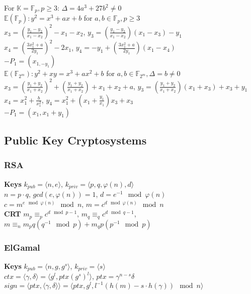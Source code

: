 \documentclass[twoside, 11pt]{article}
\begin{document}
            For $\mathds{K} = \mathds{F}_{p}, p \ge 3$: $\varDelta = 4a^{3} + 27b^{2} \neq 0$ \\
            $\mathds{E}(\mathds{F}_{p}): y^{2} = x^{3} + ax + b$ for $a, b \in \mathds{F}_{p}, p \ge 3$ \\
            $x_{3}=(\frac{y_{1}- y_{2}}{x_{1}-x_{2}})^{2} - x_{1} - x_{2}$, $y_{3} = (\frac{y_{1}-y_{2}}{x_{1}-x_{2}})(x_{1}-x_{3})-y_{1}$ \\
            $x_{4}=(\frac{3x_{1}^{2}+a}{2y_{1}})^{2}-2x_{1}$, $y_{4} = -y_{1}+(\frac{3x_{1}^{2}+a}{2y_{1}})(x_{1}-x_{4})$ \\
            $-P_{1} = (x_{1, -y_{1}})$ \\
            $\mathds{E}(\mathds{F}_{2^{m}}) : y^{2} + xy = x^{3} + ax^{2} + b$ for $a, b \in \mathds{F}_{2^{m}}, \varDelta = b\neq 0$ \\
            $x_{3}= (\frac{y_{1}+y_{2}}{x_{1}+x_{2}})^{2} + (\frac{y_{1}+y_{2}}{x_{1}+x_{2}}) + x_{1} + x_{2} + a$, $y_{3} = (\frac{y_{1}+y_{2}}{x_{1}+x_{2}})(x_{1}+ x_{3})+x_{3}+ y_{1}$ \\
            $x_{4} = x_{1}^{2}+\frac{b}{x_{1}^{2}}$, $y_{4}=x_{1}^{2}+(x_{1}+ \frac{y_{1}}{x_{1}})x_{3} + x_{3}$ \\
            $-P_{1} = (x_{1}, x_{1}+ y_{1})$\\

        \subsection*{Public Key Cryptosystems}
            \subsubsection*{RSA}
                \textbf{Keys} $k_{pub} = \langle n, e\rangle$, $k_{priv}=\langle p, q, \varphi(n), d\rangle$ \\
                $n=p\cdot q$, $gcd(e, \varphi(n))=1$, $d=e^{-1}\mod{\varphi(n)}$ \\
                $c=m^{e \mod{\varphi(n)}} \mod{n}$, $m=c^{d \mod{\varphi(n)}} \mod{n}$ \\
                \textbf{CRT} $m_{p} \equiv_{p} c^{d \mod{p-1}}$, $m_{q} \equiv_{q} c^{d \mod{q-1}}$, $m \equiv_{n} m_{p}q(q^{-1}\mod{p}) + m_{q}p(p^{-1}\mod{p})$

            \subsubsection*{ElGamal}
                \textbf{Keys} $k_{pub}=\langle n, g, g^{s}\rangle$, $k_{priv}=\langle s\rangle$ \\
                $ctx = \langle \gamma, \delta\rangle = \langle g^{l}, ptx(g^{s})^{l}\rangle$, $ptx = \gamma^{n-s}\delta$ \\
                $sign = \langle ptx, \langle \gamma, \delta\rangle\rangle = \langle ptx, g^{l}, l^{-1}(h(m)-s\cdot h(\gamma))\mod{n}\rangle$
\end{document}
